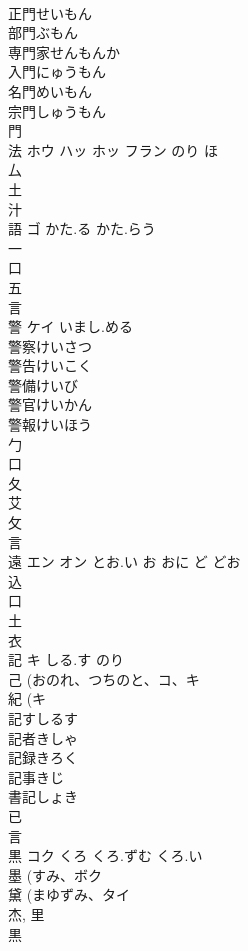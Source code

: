 \documentclass[8pt]{extreport}
\begin{document}
\begin{CJK}{UTF8}{min}
\\	正門せいもん 
\\	部門ぶもん 
\\	専門家せんもんか 
\\	入門にゅうもん 
\\	名門めいもん 
\\	宗門しゅうもん 
\\	門 
\\	法	ホウ ハッ ホッ フラン	のり ほ	
\\	厶 
\\	土 
\\	汁 
\\	語	ゴ	かた.る かた.らう	
\\	一 
\\	口 
\\	五 
\\	言 
\\	警	ケイ	いまし.める	
\\	警察けいさつ
\\	警告けいこく
\\	警備けいび
\\	警官けいかん
\\	警報けいほう
\\	勹 
\\	口 
\\	夂 
\\	艾 
\\	攵 
\\	言 
\\	遠	エン オン	とお.い お おに ど どお	
\\	込 
\\	口 
\\	土 
\\	衣 
\\	記	キ	しる.す のり	
\\	己 (おのれ、つちのと、コ、キ 
\\	紀 (キ 
\\	記すしるす 
\\	記者きしゃ 
\\	記録きろく 
\\	記事きじ 
\\	書記しょき 
\\	已 
\\	言 
\\	黒	コク	くろ くろ.ずむ くろ.い	
\\	墨 (すみ、ボク 
\\	黛 (まゆずみ、タイ 
\\	杰, 里 
\\	黒 

\end{CJK}
\end{document}
